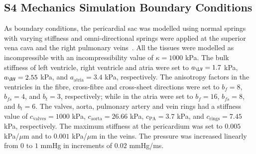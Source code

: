 \subsection*{S4 Mechanics Simulation Boundary Conditions}

As boundary conditions, the pericardial sac was modelled using normal springs
with varying stiffness and omni-directional springs were applied at the
superior vena cava and the right pulmonary veins~\cite{strocchi2023_cell}.
All the tissues were modelled as incompressible with an incompressibility
value of $\kappa=1000$ kPa.
The bulk stiffness of left ventricle, right ventricle and atria were set to
$a_{\LV}=1.7$ kPa,
$a_{\RV}=2.55$ kPa, and
$a_{\text{atria}}=3.4$ kPa, respectively.
The anisotropy factors in the ventricles in the fibre, cross-fibre and
cross-sheet directions were set to
$b_f=8$,
$b_{fs}=4$, and
$b_t=3$, respectively;
while in the atria were set to
$b_f=16$,
$b_{fs}=8$, and
$b_t=6$.
The valves, aorta, pulmonary artery and vein rings had a stiffness value of
$c_{\text{valves}}=1000$ kPa,
$c_{\text{aorta}}=26.66$ kPa,
$c_{\text{PA}}=3.7$ kPa, and
$c_{\text{rings}}=7.45$ kPa, respectively.
The maximum stiffness at the pericardium was set to $0.005$ kPa/$\mu$m and
to $0.001$ kPa/$\mu$m in the veins.
The pressure was increased linearly from $0$ to $1$ mmHg in increments of
$0.02$ mmHg/ms.
